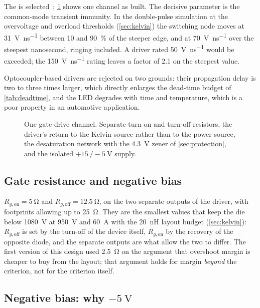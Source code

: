 The \driver{} is selected~\cite{ti_ucc21750}; \cref{fig:gatechannel} shows
one channel as built. The decisive parameter is the
common-mode transient immunity. In the double-pulse simulation at the
overvoltage and overload thresholds (\cref{sec:kelvin}) the switching node
moves at \SI{31}{\volt\per\nano\second} between \SI{10}{} and
\SI{90}{\percent} of the steeper edge, and at \SI{70}{\volt\per\nano\second}
over the steepest nanosecond, ringing included. A driver rated
\SI{50}{\volt\per\nano\second} would be exceeded; the
\SI{150}{\volt\per\nano\second} rating leaves a factor of 2.1 on the
steepest value.

Optocoupler-based drivers are rejected on two grounds: their propagation
delay is two to three times larger, which directly enlarges the dead-time
budget of \cref{tab:deadtime}, and the LED degrades with time and
temperature, which is a poor property in an automotive application.

\begin{figure}[htbp]
\centering

\caption{One gate-drive channel. Separate turn-on and turn-off resistors, the
driver's return to the Kelvin source rather than to the power source, the
desaturation network with the \SI{4.3}{\volt} zener of
\cref{sec:protection}, and the isolated $+\SI{15}{}/-\SI{5}{\volt}$
supply.}
\label{fig:gatechannel}
\end{figure}

\subsection{Gate resistance and negative bias}

$R_{g,\mathrm{on}} = \SI{5}{\ohm}$ and $R_{g,\mathrm{off}} = \SI{12.5}{\ohm}$,
on the two separate outputs of the driver, with footprints allowing up to
\SI{25}{\ohm}. They are the smallest values that keep the die below \SI{1080}{\volt} at \SI{950}{\volt} and \SI{60}{\ampere} with
the \SI{20}{\nano\henry} layout budget (\cref{sec:kelvin}): $R_{g,\mathrm{off}}$
is set by the turn-off of the device itself, $R_{g,\mathrm{on}}$ by the
recovery of the opposite diode, and the separate outputs are what allow the
two to differ. The first version of this design
used \SI{2.5}{\ohm} on the argument that overshoot margin is cheaper to buy
from the layout; that argument holds for margin \emph{beyond} the
criterion, not for the criterion itself.

\subsection{Negative bias: why \texorpdfstring{$-\SI{5}{\volt}$}{-5 V}}
\label{sec:negbias}

